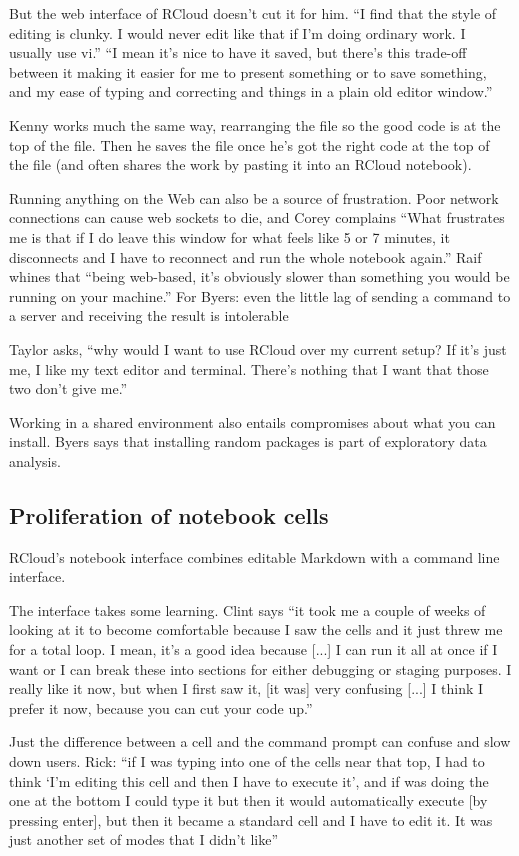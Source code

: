 But the web interface of RCloud doesn't cut it for him. ``I find that the style of editing is clunky. I would never edit like that
if I'm doing ordinary work. I usually use vi.'' ``I mean it's nice to have it
saved, but there's this trade-off between it making it easier for me to present
something or to save something, and my ease of typing and correcting and things
in a plain old editor window.''

Kenny works much the same way, rearranging the file so the good code is at the top of
the file. Then he saves the file once he's got the right code at
the top of the file (and often shares the work by pasting it into an RCloud notebook).

Running anything on the Web can also be a source of frustration.  Poor network
connections can cause web sockets to die, and Corey complains ``What frustrates me is
that if I do leave this window for what feels like 5 or 7 minutes, it
disconnects and I have to reconnect and run the whole notebook again.'' Raif
whines that ``being web-based, it's obviously slower than something you would be
running on your machine.'' For Byers: even the little lag of sending a command
to a server and receiving the result is intolerable

Taylor asks, ``why would I want to use RCloud over my
current setup? If it's just me, I like my text editor and terminal. There's
nothing that I want that those two don't give me.''

Working in a shared environment also entails compromises about what you can
install. Byers says that installing random packages is part of exploratory data
analysis.


\subsection{Proliferation of notebook cells}
RCloud's notebook interface combines editable Markdown with a command line
interface.

The interface takes some learning. Clint says ``it took me a couple of weeks of
looking at it to become comfortable because I saw the cells and it just threw me
for a total loop. I mean, it's a good idea because [...] I can run it all at
once if I want or I can break these into sections for either debugging or
staging purposes. I really like it now, but when I first saw it, [it was] very
confusing [...] I think I prefer it now, because you can cut your code up.''

Just the difference between a cell and the command prompt can confuse and slow
down users. Rick: ``if I was typing into one of the cells near that top, I had
to think `I'm editing this cell and then I have to execute it', and if was doing
the one at the bottom I could type it but then it would automatically execute
[by pressing enter], but then it became a standard cell and I have to edit
it. It was just another set of modes that I didn't like''

